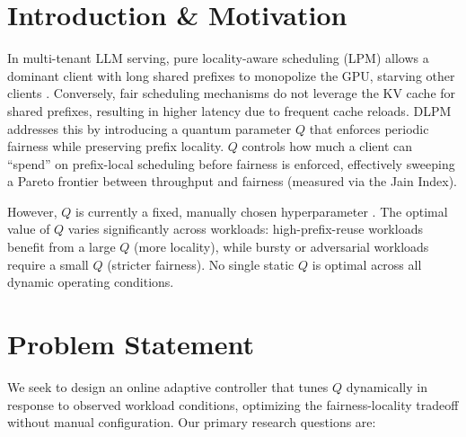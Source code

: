 \documentclass{article}
\begin{document}

\printAffiliationsAndNotice{} 

\section{Introduction \& Motivation}
In multi-tenant LLM serving, pure locality-aware scheduling (LPM) allows a dominant client with long shared prefixes to monopolize the GPU, starving other clients \cite{locality_aware_fair_scheduling_llm}. Conversely, fair scheduling mechanisms do not leverage the KV cache for shared prefixes, resulting in higher latency due to frequent cache reloads. DLPM addresses this by introducing a quantum parameter $Q$ that enforces periodic fairness while preserving prefix locality. $Q$ controls how much a client can ``spend'' on prefix-local scheduling before fairness is enforced, effectively sweeping a Pareto frontier between throughput and fairness (measured via the Jain Index).

However, $Q$ is currently a fixed, manually chosen hyperparameter \cite{locality_aware_fair_scheduling_llm}. The optimal value of $Q$ varies significantly across workloads: high-prefix-reuse workloads benefit from a large $Q$ (more locality), while bursty or adversarial workloads require a small $Q$ (stricter fairness). No single static $Q$ is optimal across all dynamic operating conditions.

\section{Problem Statement}
We seek to design an online adaptive controller that tunes $Q$ dynamically in response to observed workload conditions, optimizing the fairness-locality tradeoff without manual configuration. Our primary research questions are:
\end{document}
